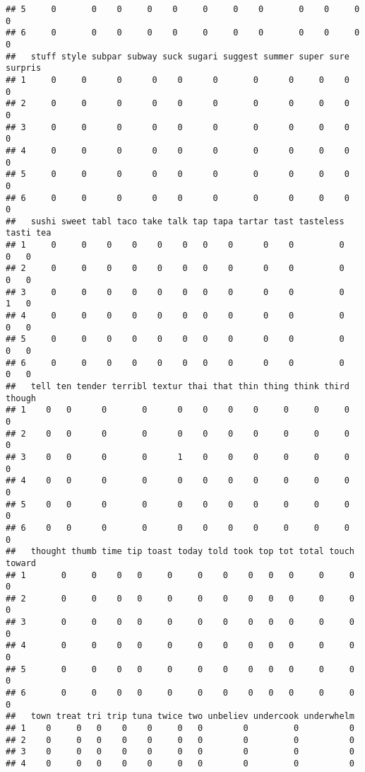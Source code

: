 \documentclass[]{article}
\begin{document}
\begin{verbatim}
## 5     0       0    0     0    0     0     0    0       0    0     0    0
## 6     0       0    0     0    0     0     0    0       0    0     0    0
##   stuff style subpar subway suck sugari suggest summer super sure surpris
## 1     0     0      0      0    0      0       0      0     0    0       0
## 2     0     0      0      0    0      0       0      0     0    0       0
## 3     0     0      0      0    0      0       0      0     0    0       0
## 4     0     0      0      0    0      0       0      0     0    0       0
## 5     0     0      0      0    0      0       0      0     0    0       0
## 6     0     0      0      0    0      0       0      0     0    0       0
##   sushi sweet tabl taco take talk tap tapa tartar tast tasteless tasti tea
## 1     0     0    0    0    0    0   0    0      0    0         0     0   0
## 2     0     0    0    0    0    0   0    0      0    0         0     0   0
## 3     0     0    0    0    0    0   0    0      0    0         0     1   0
## 4     0     0    0    0    0    0   0    0      0    0         0     0   0
## 5     0     0    0    0    0    0   0    0      0    0         0     0   0
## 6     0     0    0    0    0    0   0    0      0    0         0     0   0
##   tell ten tender terribl textur thai that thin thing think third though
## 1    0   0      0       0      0    0    0    0     0     0     0      0
## 2    0   0      0       0      0    0    0    0     0     0     0      0
## 3    0   0      0       0      1    0    0    0     0     0     0      0
## 4    0   0      0       0      0    0    0    0     0     0     0      0
## 5    0   0      0       0      0    0    0    0     0     0     0      0
## 6    0   0      0       0      0    0    0    0     0     0     0      0
##   thought thumb time tip toast today told took top tot total touch toward
## 1       0     0    0   0     0     0    0    0   0   0     0     0      0
## 2       0     0    0   0     0     0    0    0   0   0     0     0      0
## 3       0     0    0   0     0     0    0    0   0   0     0     0      0
## 4       0     0    0   0     0     0    0    0   0   0     0     0      0
## 5       0     0    0   0     0     0    0    0   0   0     0     0      0
## 6       0     0    0   0     0     0    0    0   0   0     0     0      0
##   town treat tri trip tuna twice two unbeliev undercook underwhelm
## 1    0     0   0    0    0     0   0        0         0          0
## 2    0     0   0    0    0     0   0        0         0          0
## 3    0     0   0    0    0     0   0        0         0          0
## 4    0     0   0    0    0     0   0        0         0          0

\end{verbatim}
\end{document}
